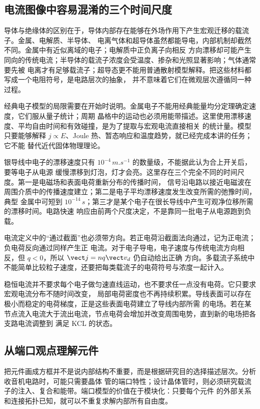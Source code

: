 \subsection*{电流图像中容易混淆的三个时间尺度}

导体与绝缘体的区别在于，导体内部存在能够在外场作用下产生宏观迁移的载流子。金属、电解质、半导体、
电离气体和超导体虽然都能导电，内部机制却截然不同。金属中有近似离域的电子；电解质中正负离子向相反
方向漂移却可能产生同向的传统电流；半导体的载流子浓度会受温度、掺杂和光照显著影响；气体通常要先被
电离才有足够载流子；超导态更不能用普通散射模型解释。把这些材料都写成一个电阻符号，是电路层次的抽象，
并不意味着它们在微观层次遵循同一种过程。

经典电子模型的局限需要在开始时说明。金属电子不能用经典能量均分定理确定速度，它们服从量子统计；周期
晶格中的运动也必须用能带描述。这里使用漂移速度、平均自由时间和有效碰撞，是为了提取与宏观电流直接相关
的统计量。模型只要能够解释 $j\propto E$、Joule 热、暂态响应和温度趋势，就已经完成本讲的任务；它不能
替代近代固体物理理论。

银导线中电子的漂移速度只有 $10^{-4}\,\si{m.s^{-1}}$ 的数量级，不能据此认为合上开关后，要等电子从电源
缓慢漂移到灯泡，灯才会亮。这里存在三个完全不同的时间尺度。第一是电磁场和表面电荷重新分布的传播时间，
信号沿电路以接近电磁波在周围介质中的传播速度建立；第二是电子平均漂移速度发生改变所需的弛豫时间，典型
金属中可短到 $10^{-14}\,\si{s}$；第三才是某个电子在很长导线中产生可观净位移所需的漂移时间。电路快速
响应由前两个尺度决定，不是靠同一批电子从电源跑到负载。

电流定义中的“通过截面”也必须带方向。若正电荷沿截面法向通过，记为正电流；负电荷反向通过同样产生正
电流。对于电子导电，电子速度与传统电流方向相反，但 $q<0$，所以 $\vect j=nq\vect v_d$ 仍自动给出正确
方向。多载流子系统中不能简单比较粒子速度，还要把每类载流子的电荷符号与浓度一起计入。

稳恒电流并不要求每个电子做匀速直线运动，也不要求任一点没有电荷。它只要求宏观电流分布不随时间改变，
局部电荷密度也不再持续积累。导线表面可以存在极小而稳定的电荷梯度，正是这些表面电荷建立了导线内部所需
的电场。若在某节点流入电流大于流出电流，节点电荷会增加并改变周围电势，直到新的电场把各支路电流调整到
满足 KCL 的状态。

\subsection*{从端口观点理解元件}

把元件画成方框并不是说内部结构不重要，而是根据研究目的选择描述层次。分析收音机电路时，可能只需要晶体
管的端口特性；设计晶体管时，则必须研究载流子的注入、复合和能带。端口模型的价值在于模块化：只要每个元件
的外部关系和连接拓扑已知，就可以不重复求解内部所有自由度。

